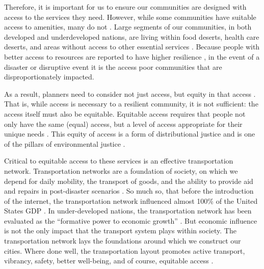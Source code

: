 \documentclass[review,3p,times,onecolumn,sort&compress,12pt]{elsarticle}
\let \cite \parencite
\begin{document}
Therefore, it is important for us to ensure our communities are designed with access to the services they need.
However, while some communities have suitable access to amenities, many do not \cite{Logan2021-ineq}.
Large segments of our communities, in both developed and underdeveloped nations, are living within food deserts, health care deserts, and areas without access to other essential services \cite{Beaulac2009-sf}.
Because people with better access to resources are reported to have higher resilience \cite{Frazier2013-wd}, in the event of a disaster or disruptive event it is the access poor communities that are disproportionately impacted.

As a result, planners need to consider not just access, but equity in that access \cite{Dempsey2011-sv}.
That is, while access is necessary to a resilient community, it is not sufficient: the access itself must also be equitable.
Equitable access requires that people not only have the same (equal) access, but a level of access appropriate for their unique needs \cite{Lucy1977-dt, Talen1998-mk}.
This equity of access is a form of distributional justice and is one of the pillars of environmental justice \cite{Low2013-yx}.

Critical to equitable access to these services is an effective transportation network.
Transportation networks are a foundation of society, on which we depend for daily mobility, the transport of goods, and the ability to provide aid and repairs in post-disaster scenarios \cite{Mattsson2015-mg, Dalziell2001-un}.
So much so, that before the introduction of the internet, the transportation network influenced almost 100\% of the United States GDP \cite{Han2000-rn}.
In under-developed nations, the transportation network has been evaluated as the ``formative power to economic growth'' \cite{Hoyle1973-ms}.
But economic influence is not the only impact that the transport system plays within society.
The transportation network lays the foundations around which we construct our cities.
Where done well, the transportation layout promotes active transport, vibrancy, safety, better well-being, and of course, equitable access \cite{Jacobs2016-ks}.
\end{document}
